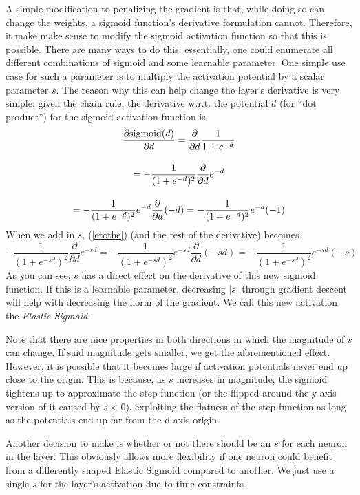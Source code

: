 A simple modification to penalizing the gradient is that, while doing so can change the weights, a
sigmoid function's derivative formulation cannot. Therefore, it make make sense to modify the
sigmoid activation function so that this is possible. There are many ways to do this: essentially,
one could enumerate all different combinations of sigmoid and some learnable parameter. One simple
use case for such a parameter is to multiply the activation potential by a scalar parameter $s$. The
reason why this can help change the layer's derivative is very simple: given the chain rule, the
derivative w.r.t. the potential $d$ (for ``dot product'') for the sigmoid activation function is
\begin{gather}
    \frac{\partial \text{sigmoid}(d)}{\partial d}
    = \frac{\partial}{\partial d} \frac{1}{1 + e^{-d}} \notag \\[10pt]
    = - \frac{1}{(1 + e^{-d})^2} \frac{\partial}{\partial d} e^{-d} \label{etothe} \\[10pt]
    = - \frac{1}{(1 + e^{-d})^2} e^{-d} \frac{\partial}{\partial d} (-d)
    = - \frac{1}{(1 + e^{-d})^2} e^{-d} (-1) \notag
\end{gather}
When we add in $s$, (\ref{etothe}) (and the rest of the derivative) becomes
\[
    - \frac{1}{(1 + e^{-sd})^2} \frac{\partial}{\partial d} e^{-sd}
    = - \frac{1}{(1 + e^{-sd})^2} e^{-sd} \frac{\partial}{\partial d} (-sd)
    = - \frac{1}{(1 + e^{-sd})^2} e^{-sd} (-s)
\]
As you can see, $s$ has a direct effect on the derivative of this new sigmoid function. If this is a
learnable parameter, decreasing $\left| s \right|$ through gradient descent will help with decreasing the norm of
the gradient. We call this new activation the \textit{Elastic Sigmoid}.

Note that there are nice properties in both directions in which the magnitude of $s$ can change. If
said magnitude gets smaller, we get the aforementioned effect. However, it is possible that it
becomes large if activation potentials never end up close to the origin. This is because, as $s$
increases in magnitude, the sigmoid tightens up to approximate the step function (or the
flipped-around-the-y-axis version of it caused by $s < 0$), exploiting the flatness of the step
function as long as the potentials end up far from the d-axis origin.

Another decision to make is whether or not there should be an $s$ for each neuron in the layer. This
obviously allows more flexibility if one neuron could benefit from a differently shaped Elastic Sigmoid
compared to another. We just use a single $s$ for the layer's activation due to time constraints.